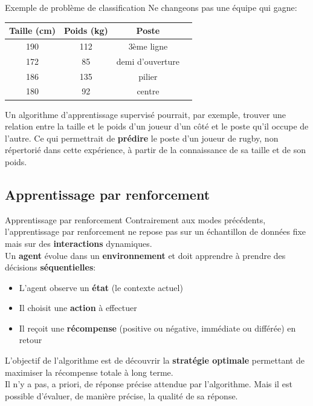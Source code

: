 \begin{frame}{Exemple de problème de classification}
	Ne changeons pas une équipe qui gagne:
	\begin{table}
		\centering
		\begin{tabular}{|c|c|c|c|}
			\hline
			\textbf{Taille} (cm) & \textbf{Poids} (kg) & \textbf{Poste} \\ \hline
			190             & 112 &  3ème ligne       \\
			172             & 85  &  demi d'ouverture \\
			186             & 135 &  pilier           \\
			180             & 92  &  centre           \\
			\hline
		\end{tabular}
	\end{table}
	Un algorithme d'apprentissage supervisé pourrait, par exemple, trouver une relation entre la taille et le poids d'un joueur d'un côté et le poste qu'il occupe de l'autre. Ce qui permettrait de \textbf{prédire} le poste d'un joueur de rugby, non répertorié dans cette expérience, à partir de la connaissance de sa taille et de son poids.
\end{frame}

\subsection[Apprentissage par renforcement]{Apprentissage par renforcement}

\begin{frame}{Apprentissage par renforcement}
	Contrairement aux modes précédents, l'apprentissage par renforcement ne repose pas sur un échantillon de données fixe mais sur des \textbf{interactions} dynamiques. \\
	\vspace{0.5cm}
	Un \textbf{agent} évolue dans un \textbf{environnement} et doit apprendre à prendre des décisions \textbf{séquentielles}:
	\begin{itemize}
		\item L'agent observe un \textbf{état} (le contexte actuel)
		\item Il choisit une \textbf{action} à effectuer
		\item Il reçoit une \textbf{récompense} (positive ou négative, immédiate ou différée) en retour
	\end{itemize}
	\vspace{0.5cm}
	L'objectif de l'algorithme est de découvrir la \textbf{stratégie optimale} permettant de maximiser la récompense totale à long terme. \\
	\vspace{0.5cm}
	Il n'y a pas, a priori, de réponse précise attendue par l'algorithme. Mais il est possible d'évaluer, de manière précise, la qualité de sa réponse.
\end{frame}


